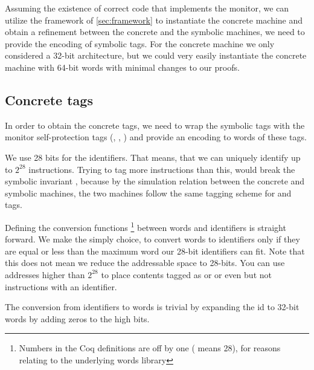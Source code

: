 Assuming the existence of correct code that implements the \CFI
monitor, we can utilize the framework of \cref{sec:framework} to
instantiate the concrete machine and obtain a refinement between the
concrete and the symbolic machines, we need to provide the encoding of
symbolic tags. For the concrete machine we only considered a 32-bit
architecture, but we could very easily
instantiate the concrete machine with 64-bit words with minimal
changes to our proofs.

\subsection{Concrete tags}\label{sec:concrete_tags}

In order to obtain the concrete tags, we need to wrap the symbolic
tags with the monitor self-protection tags (\USERname, \ENTRYname,
\MONITOR) and provide an encoding to words of these tags.

We use 28 bits for the identifiers. That means, that we can uniquely
identify up to $2^{28}$ instructions. Trying to tag more instructions
than this, would break the symbolic
invariant , because by the simulation
relation between the concrete and symbolic machines, the two machines
follow the same tagging scheme for \USERname and \ENTRYname tags.

Defining the conversion functions \footnote{Numbers in the Coq
  definitions are off by one ( means 28), for reasons relating
  to the underlying words library} between
words and identifiers is straight forward. We make the
simply choice, to convert words to identifiers only if they
are equal or less than the maximum word our 28-bit identifiers can
fit. Note that this does not mean we reduce the addressable space to
28-bits. You can use addresses higher than $2^{28}$ to place contents
tagged as \DATAname or \MONITOR or even \INSTR{$\bot$} but not
instructions with an identifier.

The conversion from identifiers to words is trivial by
expanding the id to 32-bit words by adding zeros to the high bits.



